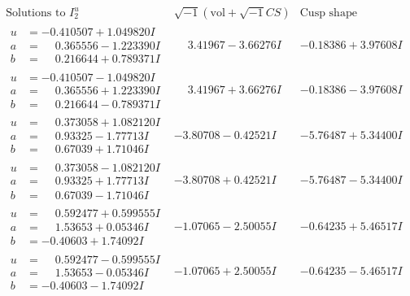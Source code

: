 \documentclass[1p]{elsarticle_modified}
\theoremstyle{definition}
\newcommand{\I}{\sqrt{-1}}
\begin{document}
$$\begin{array}{c|c|c}  
\text{Solutions to }I^u_{2}& \I (\text{vol} + \sqrt{-1}CS) & \text{Cusp shape}\\
 \hline 
\begin{aligned}
u &= -0.410507 + 1.049820 I \\
a &= \phantom{-}0.365556 - 1.223390 I \\
b &= \phantom{-}0.216644 + 0.789371 I\end{aligned}
 & \phantom{-}3.41967 - 3.66276 I & -0.18386 + 3.97608 I \\ \hline\begin{aligned}
u &= -0.410507 - 1.049820 I \\
a &= \phantom{-}0.365556 + 1.223390 I \\
b &= \phantom{-}0.216644 - 0.789371 I\end{aligned}
 & \phantom{-}3.41967 + 3.66276 I & -0.18386 - 3.97608 I \\ \hline\begin{aligned}
u &= \phantom{-}0.373058 + 1.082120 I \\
a &= \phantom{-}0.93325 - 1.77713 I \\
b &= \phantom{-}0.67039 + 1.71046 I\end{aligned}
 & -3.80708 - 0.42521 I & -5.76487 + 5.34400 I \\ \hline\begin{aligned}
u &= \phantom{-}0.373058 - 1.082120 I \\
a &= \phantom{-}0.93325 + 1.77713 I \\
b &= \phantom{-}0.67039 - 1.71046 I\end{aligned}
 & -3.80708 + 0.42521 I & -5.76487 - 5.34400 I \\ \hline\begin{aligned}
u &= \phantom{-}0.592477 + 0.599555 I \\
a &= \phantom{-}1.53653 + 0.05346 I \\
b &= -0.40603 + 1.74092 I\end{aligned}
 & -1.07065 - 2.50055 I & -0.64235 + 5.46517 I \\ \hline\begin{aligned}
u &= \phantom{-}0.592477 - 0.599555 I \\
a &= \phantom{-}1.53653 - 0.05346 I \\
b &= -0.40603 - 1.74092 I\end{aligned}
 & -1.07065 + 2.50055 I & -0.64235 - 5.46517 I \\ \hline\begin{aligned}

\end{aligned}
\end{array}$$
\end{document}
